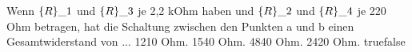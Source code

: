     {Wenn $\textrm\{R\}\_1$ und $\textrm\{R\}\_3$ je 2,2 kOhm haben und $\textrm\{R\}\_2$ und $\textrm\{R\}\_4$ je 220 Ohm betragen, hat die Schaltung zwischen den Punkten a und b einen Gesamtwiderstand von ...}
    {1210 Ohm.}
    {1540 Ohm.}
    {4840 Ohm.}
    {2420 Ohm.}
    {true}{false}